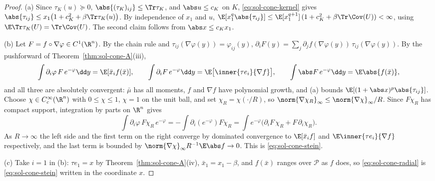 \documentclass[../main.tex]{subfiles}
\begin{document}
\begin{proof}
(a) Since $\tau_K(u)\succeq0$, $\abs{(\tau_K)_{ij}}\le\Tr\tau_K$, and $\abs u\le c_K$ on $K$,
\eqref{eq:sol-cone-kernel} gives $\abs{\tau_{ij}}\le x_1\bigl(1+c_K^2+\beta\Tr\tau_K(u)\bigr)$.
By independence of $x_1$ and $u$, $\E[x_1^q\abs{\tau_{ij}}]\le\E[x_1^{q+1}]\,(1+c_K^2+\beta\Tr\Cov(U))<\infty$,
using $\E\Tr\tau_K(U)=\Tr\Cov(U)$.  The second claim follows from $\abs x\le c_Kx_1$.

(b) Let $F=f\circ\nabla\varphi\in C^1(\R^n)$.  By the chain rule and
$\tau_{ij}(\nabla\varphi(y))=\varphi_{ij}(y)$,
$\partial_iF(y)=\sum_j\partial_jf(\nabla\varphi(y))\,\tau_{ij}(\nabla\varphi(y))$.  By the
pushforward of Theorem~\ref{thm:sol-cone-A}(iii),
\[
  \int\partial_i\varphi\,F\,e^{-\varphi}\dd y=\E[\bar x_if(\bar x)],\qquad
  \int\partial_iF\,e^{-\varphi}\dd y=\E\bigl[\inner{\tau e_i}{\nabla f}\bigr],\qquad
  \int\abs F\,e^{-\varphi}\dd y=\E\abs{f(\bar x)},
\]
and all three are absolutely convergent: $\bar\mu$ has all moments, $f$ and $\nabla f$ have
polynomial growth, and (a) bounds $\E[(1+\abs x)^p\abs{\tau_{ij}}]$.  Choose
$\chi\in C_c^\infty(\R^n)$ with $0\le\chi\le1$, $\chi=1$ on the unit ball, and set
$\chi_R=\chi(\cdot/R)$, so $\norm{\nabla\chi_R}_\infty\le\norm{\nabla\chi}_\infty/R$.  Since
$F\chi_R$ has compact support, integration by parts on $\R^n$ gives
\[
  \int\partial_i\varphi\,F\chi_R\,e^{-\varphi}
  =-\int\partial_i(e^{-\varphi})F\chi_R
  =\int e^{-\varphi}\bigl(\partial_iF\,\chi_R+F\,\partial_i\chi_R\bigr).
\]
As $R\to\infty$ the left side and the first term on the right converge by dominated
convergence to $\E[\bar x_if]$ and $\E\inner{\tau e_i}{\nabla f}$ respectively, and the last
term is bounded by $\norm{\nabla\chi}_\infty R^{-1}\E\abs f\to0$.  This is
\eqref{eq:sol-cone-stein}.

(c) Take $i=1$ in (b): $\tau e_1=x$ by Theorem~\ref{thm:sol-cone-A}(iv), $\bar x_1=x_1-\beta$,
and $f(\bar x)$ ranges over $\mathscr P$ as $f$ does, so \eqref{eq:sol-cone-radial} is
\eqref{eq:sol-cone-stein} written in the coordinate $x$.
\end{proof}
\end{document}
